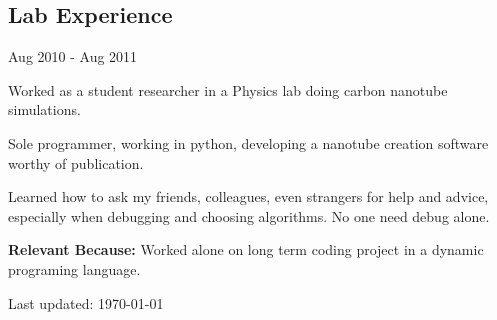 \documentclass[10pt,letterpaper]{article}
\renewenvironment{itemize}{
  \begin{list}{}{
    \setlength{\leftmargin}{1.5em}
    \setlength{\itemsep}{0.25em}
    \setlength{\parskip}{0pt}
    \setlength{\parsep}{0.25em}
  }
}{
  \end{list}
}
\begin{document}
\subsection*{Lab Experience}
\begin{itemize}

    \item Aug 2010 - Aug 2011
    \item Worked as a student researcher in a Physics lab doing carbon nanotube simulations.
    \item Sole programmer, working in python, developing a nanotube creation software worthy of publication.
    \item Learned how to ask my friends, colleagues, even strangers for help and advice, especially when debugging and choosing algorithms. No one need debug alone.
    \item \textbf{Relevant Because:} Worked alone on long term coding project in a dynamic programing language.

\end{itemize}


\bigskip

\begin{center}
  \begin{small}
    Last updated: \today
  \end{small}
\end{center}
\end{document}
